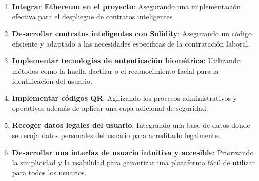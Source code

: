 \begin{enumerate}

\item \textbf{Integrar Ethereum en el proyecto}: Asegurando una implementación efectiva para el despliegue de contratos inteligentes

\item \textbf{Desarrollar contratos inteligentes con Solidity}: Asegurando un código eficiente y adaptado a las necesidades específicas de la contratación laboral. 

\item \textbf{Implementar tecnologías de autenticación biométrica}: Utilizando métodos como la huella dactilar o el reconocimiento facial para la identificación del usuario.

\item \textbf{Implementar códigos QR}: Agilizando los procesos administrativos y operativos además de aplicar una capa adicional de seguridad.

\item \textbf{Recoger datos legales del usuario}: Integrando una base de datos donde se recoja datos personales del usuario para acreditarlo legalmente.

\item \textbf{Desarrollar una interfaz de usuario intuitiva y accesible}: Priorizando la simplicidad y la usabilidad para garantizar una plataforma fácil de utilizar para todos los usuarios.



\end{enumerate}